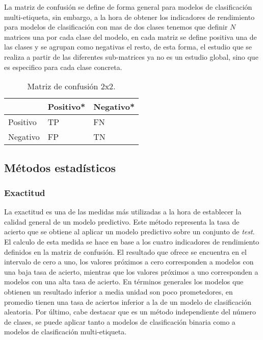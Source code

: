 \pagebreak

La matriz de confusión se define de forma general para modelos de clasificación multi-etiqueta, sin embargo, a la hora de obtener los indicadores de rendimiento para modelos de clasificación con mas de dos clases tenemos que definir $N$ matrices una por cada clase del modelo, en cada matriz se define positiva una de las clases y se agrupan como negativas el resto, de esta forma, el estudio que se realiza a partir de las diferentes sub-matrices ya no es un estudio global, sino que es especifico para cada clase concreta.

\begin{table}[ht]
    \centering
    \begin{tabularx}{200pt}{Y Y Y}
                 & Positivo*    & Negativo* \\\hline
        Positivo & TP           & FN        \\\hline
        Negativo & FP           & TN        \\\hline
    \end{tabularx}

    \caption{Matriz de confusión 2x2.}
    \label{tab:1}
\end{table}


\subsection{Métodos estadísticos}


\subsubsection{Exactitud}

La exactitud es una de las medidas más utilizadas a la hora de establecer la calidad general de un modelo predictivo. Este método representa la tasa de acierto que se obtiene al aplicar un modelo predictivo sobre un conjunto de \textit{test}. El calculo de esta medida se hace en base a los cuatro indicadores de rendimiento definidos en la matriz de confusión. El resultado que ofrece se encuentra en el intervalo de cero a uno, los valores próximos a cero corresponden a modelos con una baja tasa de acierto, mientras que los valores próximos a uno corresponden a modelos con una alta tasa de acierto. En términos generales los modelos que obtienen un resultado inferior a media unidad son poco prometedores, en promedio tienen una tasa de aciertos inferior a la de un modelo de clasificación aleatoria. Por último, cabe destacar que es un método independiente del número de clases, se puede aplicar tanto a modelos de clasificación binaria como a modelos de clasificación multi-etiqueta.

